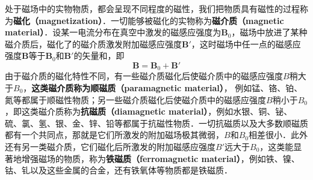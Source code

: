 
处于磁场中的实物物质，都会呈现不同程度的磁性，我们把物质具有磁性的过程称为\textbf{磁化（magnetization）}．一切能够被磁化的实物称为\textbf{磁介质（magnetic material）}．设某一电流分布在真空中激发的磁感应强度为$\mathbf B_0$，磁场中放进了某种磁介质后，磁化了的磁介质激发附加磁感应强度$\mathbf B'$，这时磁场中任一点的磁感应强度$\mathbf B $等于$\mathbf B_0$和$\mathbf B'$的矢量和，即
\begin{equation}
\mathbf B=\mathbf B_0+\mathbf B'
\end{equation}
由于磁介质的磁化特性不同，有一些磁介质磁化后使磁介质中的磁感应强度$B$稍大于$B_0$，\textbf{这类磁介质称为顺磁质（paramagnetic material）}， 例如锰、铬、铂、氮等都属于顺磁性物质；另一些磁介质磁化后使磁介质中的磁感应强度$B$稍小于$B_0$，即这类磁介质称为\textbf{抗磁质（diamagnetic material）}，例如水银、铜、铋、硫、氯、氢、银、金、锌、铅等都属于抗磁性物质．一切抗磁质以及大多数顺磁质都有一个共同点，那就是它们所激发的附加磁场极其微弱，$B$和$B_0$相差很小．此外还有另一类磁介质，它们磁化后所激发的附加磁感应强度$B'$远大于$B_0$，这类能显著地增强磁场的物质，称为\textbf{铁磁质（ferromagnetic material）}，例如铁、镍、钴、钆以及这些金属的合金，还有铁氧体等物质都是铁磁质．